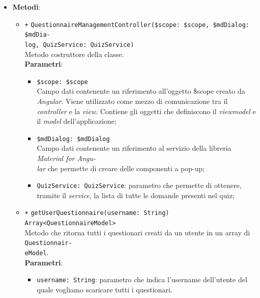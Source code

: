 \begin{itemize}
	\item \textbf{Metodi}:
	\begin{itemize}
		\item \texttt{+} \texttt{QuestionnaireManagementController(\$scope: \$scope, \$mdDialog: \$mdDia-\\log, QuizService: QuizService)} \\Metodo costruttore della classe.\\
		\textbf{Parametri}: 
		\begin{itemize}
			\item \texttt{\$scope: \$scope} \\
			Campo dati contenente un riferimento all'oggetto \$scope creato da \textit{Angular}. Viene utilizzato come mezzo di comunicazione tra il \textit{controller} e la \textit{view}. Contiene gli oggetti che definiscono il \textit{viewmodel} e il \textit{model} dell'applicazione;
			\item \texttt{\$mdDialog: \$mdDialog} \\
			Campo dati contenente un riferimento al servizio della libreria \textit{Material for Angu-\\lar{}} che permette di creare delle componenti a pop-up;
			\item \texttt{QuizService: QuizService}: parametro che permette di ottenere, tramite il \textit{service}, la lista di tutte le domande presenti nel quiz;
		\end{itemize}
		\item \texttt{+} \texttt{getUserQuestionnaire(username: String) Array<QuestionnaireModel>} \\Metodo che ritorna tutti i questionari creati da un utente in un array di \texttt{Questionnair-\\eModel}. \\
		\textbf{Parametri}:
		\begin{itemize}
			\item \texttt{username: String}: parametro che indica l'username dell'utente del quale vogliamo scaricare tutti i questionari.
		\end{itemize}
	\end{itemize}
\end{itemize}

